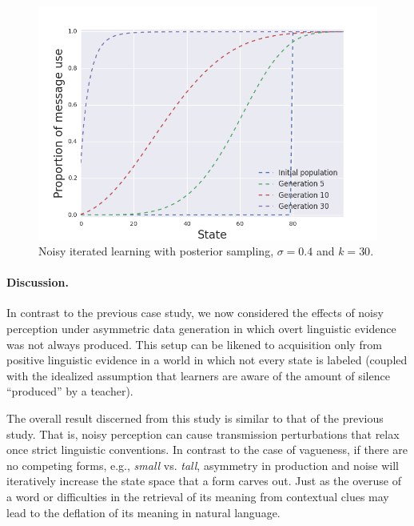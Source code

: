 \documentclass[10pt,a4paper]{article}
\begin{document}
\begin{figure}[ht]
\centering
    \includegraphics[scale=0.4]{../code/plots/deflation-sigma04.png}
  \caption{Noisy iterated learning with posterior sampling, $\sigma = 0.4$ and $k = 30$.}
  \label{fig:defl}
\end{figure}

\paragraph{Discussion.} In contrast to the previous case study, we now considered the effects of noisy perception under asymmetric data generation in which overt linguistic evidence was not always produced. This setup can be likened to acquisition only from positive linguistic evidence in a world in which not every state is labeled (coupled with the idealized assumption that learners are aware of the amount of silence ``produced'' by a teacher). 

The overall result discerned from this study is similar to that of the previous study. That is, noisy perception can cause transmission perturbations that relax once strict linguistic conventions. In contrast to the case of vagueness, if there are no competing forms, e.g., {\em small} vs. {\em tall}, asymmetry in production and noise will iteratively increase the state space that a form carves out. Just as the overuse of a word or difficulties in the retrieval of its meaning from contextual clues may lead to the deflation of its meaning in natural language.
\end{document}

